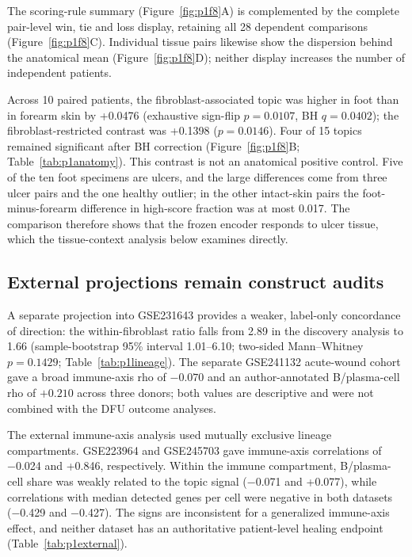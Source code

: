 

The scoring-rule summary (Figure~\ref{fig:p1f8}A\label{call:p1f8}) is complemented by the complete pair-level win, tie and loss display, retaining all 28 dependent comparisons (Figure~\ref{fig:p1f8}C). Individual tissue pairs likewise show the dispersion behind the anatomical mean (Figure~\ref{fig:p1f8}D); neither display increases the number of independent patients.

Across 10 paired patients, the fibroblast-associated topic was higher in foot than in forearm skin by +0.0476 (exhaustive sign-flip $p=0.0107$, BH $q=0.0402$); the fibroblast-restricted contrast was +0.1398 ($p=0.0146$). Four of 15 topics remained significant after BH correction (Figure~\ref{fig:p1f8}B; Table~\ref{tab:p1anatomy}). This contrast is not an anatomical positive control. Five of the ten foot specimens are ulcers, and the large differences come from three ulcer pairs and the one healthy outlier; in the other intact-skin pairs the foot-minus-forearm difference in high-score fraction was at most 0.017. The comparison therefore shows that the frozen encoder responds to ulcer tissue, which the tissue-context analysis below examines directly.

\subsection{External projections remain construct audits}

A separate projection into GSE231643 provides a weaker, label-only concordance of direction: the within-fibroblast ratio falls from 2.89 in the discovery analysis to 1.66 (sample-bootstrap 95\% interval 1.01--6.10; two-sided Mann--Whitney $p=0.1429$; Table~\ref{tab:p1lineage}). The separate GSE241132 acute-wound cohort gave a broad immune-axis rho of $-0.070$ and an author-annotated B/plasma-cell rho of $+0.210$ across three donors; both values are descriptive and were not combined with the DFU outcome analyses.

The external immune-axis analysis used mutually exclusive lineage compartments. GSE223964 and GSE245703 gave immune-axis correlations of −0.024 and +0.846, respectively. Within the immune compartment, B/plasma-cell share was weakly related to the topic signal (−0.071 and +0.077), while correlations with median detected genes per cell were negative in both datasets (−0.429 and −0.427). The signs are inconsistent for a generalized immune-axis effect, and neither dataset has an authoritative patient-level healing endpoint (Table~\ref{tab:p1external}).

